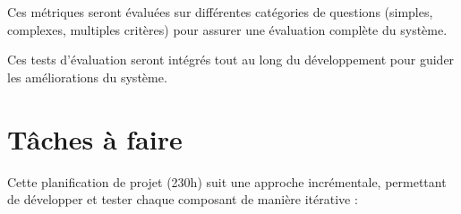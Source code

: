 \documentclass[a4paper,11pt]{article}
\begin{document}
Ces métriques seront évaluées sur différentes catégories de questions (simples, complexes, multiples critères) pour assurer une évaluation complète du système. 

Ces tests d'évaluation seront intégrés tout au long du développement pour guider les améliorations du système.


\section{Tâches à faire}
\label{sec:taches}

Cette planification de projet (230h) suit une approche incrémentale, permettant de développer et tester chaque composant de manière itérative :
\end{document}
